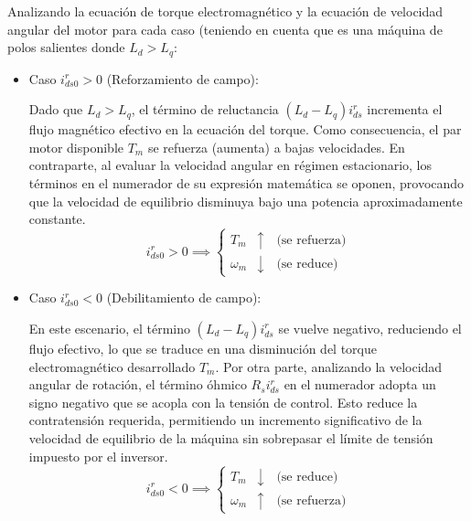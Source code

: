 \documentclass[blue,fullpaper]{ludusofficial}  %
\begin{document}
Analizando la ecuación de torque electromagnético y la ecuación de velocidad angular del motor para cada caso (teniendo en cuenta que es una máquina de polos salientes donde $L_d>L_q$:
\begin{itemize}
    \item Caso $i^r_{ds0}>0$ (Reforzamiento de campo):
    
    Dado que $L_d > L_q$, el término de reluctancia $(L_d - L_q)i_{ds}^r$ incrementa el flujo magnético efectivo en la ecuación del torque. Como consecuencia, el par motor disponible $T_m$ se refuerza (aumenta) a bajas velocidades. En contraparte, al evaluar la velocidad angular en régimen estacionario, los términos en el numerador de su expresión matemática se oponen, provocando que la velocidad de equilibrio disminuya bajo una potencia aproximadamente constante.
    \[
    i_{ds0}^{r} > 0 \implies \left\{ 
    \begin{aligned}
    T_{m} &\uparrow \quad \text{(se refuerza)} \\
    \omega_{m} &\downarrow \quad \text{(se reduce)}
    \end{aligned}
    \right.
    \]

    \item Caso $i^r_{ds0}<0$ (Debilitamiento de campo):
    
    En este escenario, el término $(L_d - L_q)i_{ds}^r$ se vuelve negativo, reduciendo el flujo efectivo, lo que se traduce en una disminución del torque electromagnético desarrollado $T_m$. Por otra parte, analizando la velocidad angular de rotación, el término óhmico $R_s i_{ds}^r$ en el numerador adopta un signo negativo que se acopla con la tensión de control. Esto reduce la contratensión requerida, permitiendo un incremento significativo de la velocidad de equilibrio de la máquina sin sobrepasar el límite de tensión impuesto por el inversor.   
    \[
    i_{ds0}^{r} < 0 \implies \left\{ 
    \begin{aligned}
    T_{m} &\downarrow \quad \text{(se reduce)} \\
    \omega_{m} &\uparrow \quad \text{(se refuerza)}
    \end{aligned}
    \right.
    \]
\end{itemize}
\end{document}
